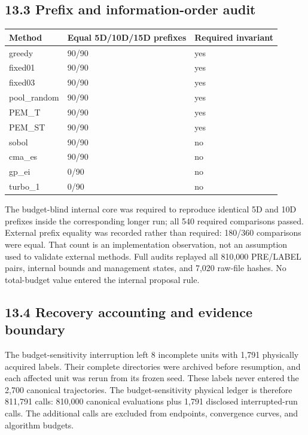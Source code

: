 \documentclass[11pt,a4paper]{article}
\begin{document}
\hypertarget{prefix-and-information-order-audit}{%
\subsection{13.3 Prefix and information-order
audit}\label{prefix-and-information-order-audit}}

\par\noindent\begin{minipage}{\linewidth}

\begin{longtable}[]{@{}lll@{}}
\toprule
Method & Equal 5D/10D/15D prefixes & Required invariant \\
\midrule
\endhead
greedy & 90/90 & yes \\
fixed01 & 90/90 & yes \\
fixed03 & 90/90 & yes \\
pool\_random & 90/90 & yes \\
PEM\_T & 90/90 & yes \\
PEM\_ST & 90/90 & yes \\
sobol & 90/90 & no \\
cma\_es & 90/90 & no \\
gp\_ei & 0/90 & no \\
turbo\_1 & 0/90 & no \\
\bottomrule
\end{longtable}

\end{minipage}\par

The budget-blind internal core was required to reproduce identical 5D
and 10D prefixes inside the corresponding longer run; all 540 required
comparisons passed. External prefix equality was recorded rather than
required: 180/360 comparisons were equal. That count is an
implementation observation, not an assumption used to validate external
methods. Full audits replayed all 810,000 PRE/LABEL pairs, internal
bounds and management states, and 7,020 raw-file hashes. No total-budget
value entered the internal proposal rule.

\hypertarget{recovery-accounting-and-evidence-boundary}{%
\subsection{13.4 Recovery accounting and evidence
boundary}\label{recovery-accounting-and-evidence-boundary}}

The budget-sensitivity interruption left 8 incomplete units with 1,791
physically acquired labels. Their complete directories were archived
before resumption, and each affected unit was rerun from its frozen
seed. These labels never entered the 2,700 canonical trajectories. The
budget-sensitivity physical ledger is therefore 811,791 calls: 810,000
canonical evaluations plus 1,791 disclosed interrupted-run calls. The
additional calls are excluded from endpoints, convergence curves, and
algorithm budgets.
\end{document}
